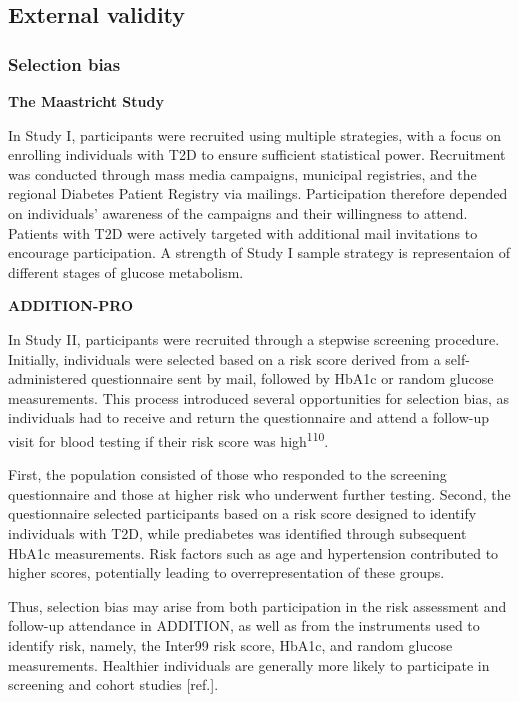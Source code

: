 \documentclass[
  a4paper,
  headsepline=true,
  open=any]{scrbook}
\begin{document}
\hypertarget{external-validity}{%
\subsection{External validity}\label{external-validity}}

\hypertarget{selection-bias}{%
\subsubsection{Selection bias}\label{selection-bias}}

\textbf{The Maastricht Study}

In Study I, participants were recruited using multiple strategies, with
a focus on enrolling individuals with T2D to ensure sufficient
statistical power. Recruitment was conducted through mass media
campaigns, municipal registries, and the regional Diabetes Patient
Registry via mailings. Participation therefore depended on individuals'
awareness of the campaigns and their willingness to attend. Patients
with T2D were actively targeted with additional mail invitations to
encourage participation. A strength of Study I sample strategy is
representaion of different stages of glucose metabolism.

\textbf{ADDITION-PRO}

In Study II, participants were recruited through a stepwise screening
procedure. Initially, individuals were selected based on a risk score
derived from a self-administered questionnaire sent by mail, followed by
HbA1c or random glucose measurements. This process introduced several
opportunities for selection bias, as individuals had to receive and
return the questionnaire and attend a follow-up visit for blood testing
if their risk score was high\textsuperscript{110}.

First, the population consisted of those who responded to the screening
questionnaire and those at higher risk who underwent further testing.
Second, the questionnaire selected participants based on a risk score
designed to identify individuals with T2D, while prediabetes was
identified through subsequent HbA1c measurements. Risk factors such as
age and hypertension contributed to higher scores, potentially leading
to overrepresentation of these groups.

Thus, selection bias may arise from both participation in the risk
assessment and follow-up attendance in ADDITION, as well as from the
instruments used to identify risk, namely, the Inter99 risk score,
HbA1c, and random glucose measurements. Healthier individuals are
generally more likely to participate in screening and cohort studies
{[}ref.{]}.
\end{document}

